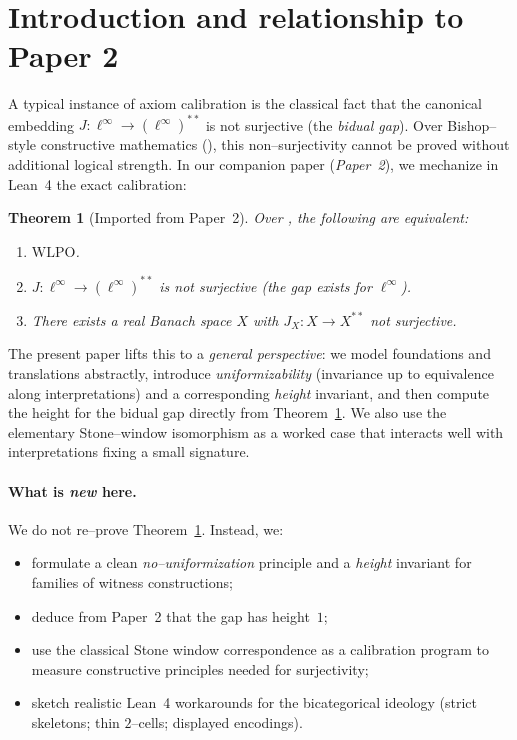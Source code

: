\documentclass[11pt]{article}
\newtheorem{theorem}{Theorem}[section]
\theoremstyle{definition}
\theoremstyle{remark}
\newcommand{\linf}{\ell^\infty}
\newcommand{\WLPO}{\mathrm{WLPO}}
\newcommand{\BISH}{\mathrm{BISH}}
\begin{document}
\section{Introduction and relationship to Paper 2}

A typical instance of axiom calibration is the classical fact that the canonical embedding $J:\linf\to(\linf)^{**}$ is not surjective (the \emph{bidual gap}). Over Bishop--style constructive mathematics (\BISH), this non--surjectivity cannot be proved without additional logical strength. In our companion paper (\emph{Paper~2}), we mechanize in Lean~4 the exact calibration:

\begin{theorem}[Imported from Paper~2]\label{thm:paper2}
Over \BISH, the following are equivalent:
\begin{enumerate}
\item $\WLPO$.
\item $J:\linf\to(\linf)^{**}$ is not surjective (the gap exists for $\linf$).
\item There exists a real Banach space $X$ with $J_X:X\to X^{**}$ not surjective.
\end{enumerate}
\end{theorem}

The present paper lifts this to a \emph{general perspective}: we model foundations and translations abstractly, introduce \emph{uniformizability} (invariance up to equivalence along interpretations) and a corresponding \emph{height} invariant, and then compute the height for the bidual gap directly from Theorem~\ref{thm:paper2}. We also use the elementary Stone--window isomorphism as a worked case that interacts well with interpretations fixing a small signature.

\paragraph{What is \emph{new} here.}
We do not re--prove Theorem~\ref{thm:paper2}. Instead, we:
\begin{itemize}
\item formulate a clean \emph{no--uniformization} principle and a \emph{height} invariant for families of witness constructions;
\item deduce from Paper~2 that the gap has height~$1$;
\item use the classical Stone window correspondence as a calibration program to measure constructive principles needed for surjectivity;
\item sketch realistic Lean~4 workarounds for the bicategorical ideology (strict skeletons; thin $2$--cells; displayed encodings).
\end{itemize}
\end{document}
